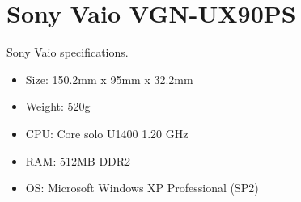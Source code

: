 \chapter{Sony Vaio VGN-UX90PS}
\label{AppendixA}

Sony Vaio specifications.

\begin{itemize}
\item Size: 150.2mm x 95mm x 32.2mm
\item Weight: 520g
\item CPU: Core solo U1400 1.20 GHz
\item RAM: 512MB DDR2
\item OS: Microsoft Windows XP Professional (SP2)
\end{itemize}
